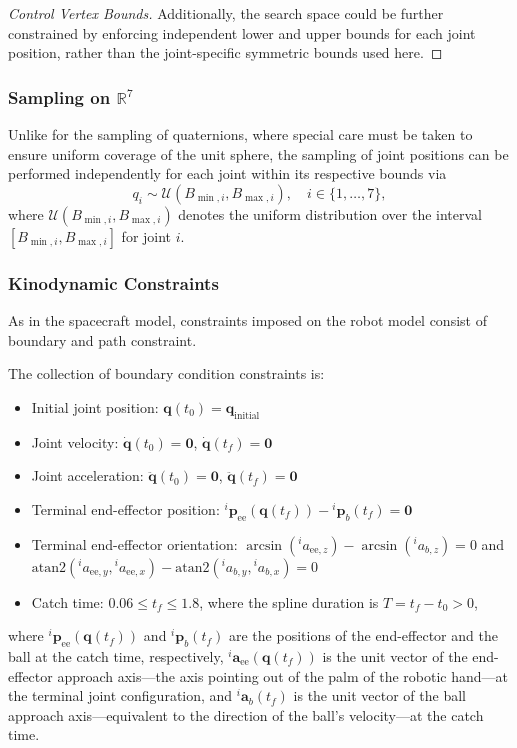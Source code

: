 \begin{proof}[Control Vertex Bounds]
Additionally, the search space could be further constrained by enforcing independent lower and upper bounds for each joint position, rather than the joint-specific symmetric bounds used here.
\end{proof}

\subsubsection{Sampling on $\mathbb{R}^7$}
\label{sec:SampleR7}
Unlike for the sampling of quaternions, where special care must be taken to ensure uniform coverage of the unit sphere, the sampling of joint positions can be performed independently for each joint within its respective bounds via 
\begin{equation}
q_i \sim \mathcal{U}(B_{\min,i}, B_{\max,i}), \quad i \in \{1, \dots, 7\},
\end{equation}
where $\mathcal{U}(B_{\min,i}, B_{\max,i})$ denotes the uniform distribution over the interval $[B_{\min,i}, B_{\max,i}]$ for joint $i$.

\subsubsection{Kinodynamic Constraints}
\label{sec:arm7_kinodyn_constraints}
As in the spacecraft model, constraints imposed on the robot model consist of boundary and path constraint. 

The collection of boundary condition constraints is:
\begin{itemize}
    \item Initial joint position: $\mathbf{q}(t_0) = \mathbf{q}_{\text{initial}}$
    \item Joint velocity: $\mathbf{\dot{q}}(t_0) = \mathbf{0}$, $\mathbf{\dot{q}}(t_f) = \mathbf{0}$
    \item Joint acceleration: $\mathbf{\ddot{q}}(t_0) = \mathbf{0}$, $\mathbf{\ddot{q}}(t_f) = \mathbf{0}$
    \item Terminal end-effector position: ${}^i\mathbf{p}_{\text{ee}}(\mathbf{q}(t_f)) - {}^i\mathbf{p}_b(t_f) = \mathbf{0}$
    \item Terminal end-effector orientation: $\arcsin({}^i a_{\text{ee},z}) - \arcsin({}^i a_{b,z}) = 0$ and \\
    $\text{atan2}({}^i a_{\text{ee},y}, {}^i a_{\text{ee},x}) - \text{atan2}({}^i a_{b,y}, {}^i a_{b,x}) = 0$
    \item Catch time: $0.06 \le t_f \le 1.8$, where the spline duration is $T = t_f - t_0 > 0$,
\end{itemize}
where ${}^i\mathbf{p}_{\text{ee}}(\mathbf{q}(t_f))$ and ${}^i\mathbf{p}_b(t_f)$ are the positions of the end-effector and the ball at the catch time, respectively,
${}^i \mathbf{a}_{\text{ee}}(\mathbf{q}(t_f))$ is the unit vector of the end-effector approach axis---the axis pointing out of the palm of the robotic hand---at the terminal joint configuration, 
and ${}^i \mathbf{a}_b(t_f)$ is the unit vector of the ball approach axis---equivalent to the direction of the ball's velocity---at the catch time.

